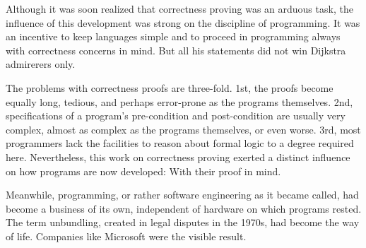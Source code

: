 Although it was soon realized that correctness proving was an arduous task, the
influence of this development was strong on the discipline of programming. It was an
incentive to keep languages simple and to proceed in programming always with
correctness concerns in mind. But all his statements did not win Dijkstra admirerers
only.

The problems with correctness proofs are three-fold. 1st, the proofs become equally
long, tedious, and perhaps error-prone as the programs themselves. 2nd, specifications
of a program's pre-condition and post-condition are usually very complex, almost as
complex as the programs themselves, or even worse. 3rd, most programmers lack the
facilities to reason about formal logic to a degree required here. Nevertheless, this
work on correctness proving exerted a distinct influence on how programs are now
developed: With their proof in mind.

Meanwhile, programming, or rather software engineering as it became called, had
become a business of its own, independent of hardware on which programs rested. The
term unbundling, created in legal disputes in the 1970s, had become the way of life.
Companies like Microsoft were the visible result.
